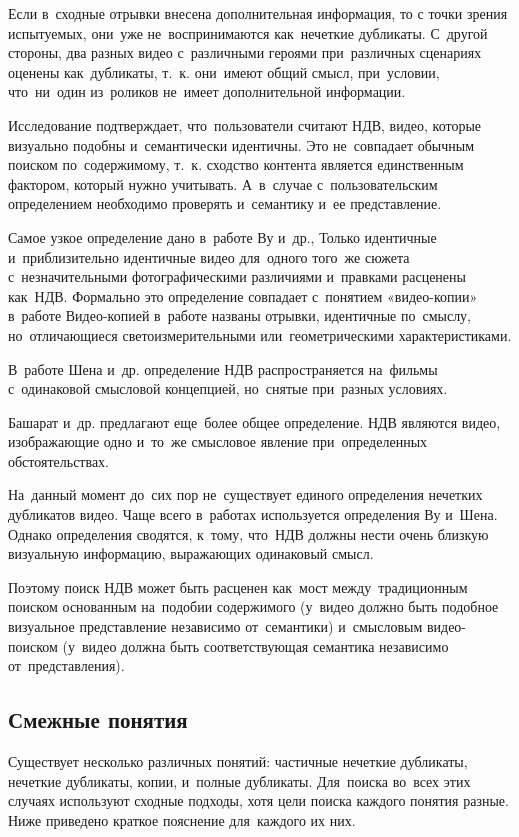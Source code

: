 Если в~сходные отрывки внесена дополнительная информация,
то с точки зрения испытуемых, 
они~уже не~воспринимаются как~нечеткие дубликаты.
С~другой стороны, два разных видео с~различными героями
при~различных сценариях оценены как~дубликаты, т.~к. они~имеют общий смысл,
при~условии, что~ни~один из~роликов не~имеет дополнительной информации.

Исследование подтверждает, что~пользователи считают НДВ,
видео, которые визуально подобны и~семантически идентичны.
Это не~совпадает обычным поиском по~содержимому,
т.~к. сходство контента является 
единственным фактором, который нужно учитывать.
А~в~случае с~пользовательским определением необходимо проверять
и~семантику и~ее представление.


Самое узкое определение дано в~работе Ву и~др.,
Только идентичные и~приблизительно идентичные видео
для~одного того~же сюжета с~незначительными фотографическими различиями
и~правками расценены как~НДВ.
Формально это определение совпадает
с~понятием «видео-копии» в~работе \cite{Law-To:2007}
Видео-копией в~работе названы отрывки, идентичные по~смыслу,
но~отличающиеся светоизмерительными или~геометрическими характеристиками.

В~работе Шена и~др. \cite{Shen:2007} определение НДВ распространяется
на~фильмы с~одинаковой смысловой концепцией, но~снятые при~разных условиях.

Башарат и~др. \cite{Basharat:2008}  
предлагают еще~более общее определение.
НДВ являются видео, изображающие одно и~то~же смысловое явление
при~определенных обстоятельствах.


На~данный момент до~сих пор не~существует единого
определения нечетких дубликатов видео.
Чаще всего в~работах используется определения Ву  и~Шена.
Однако определения сводятся, к~тому, что~НДВ должны нести очень
близкую визуальную информацию, выражающих одинаковый смысл.

Поэтому поиск НДВ может быть расценен как~мост
между~традиционным поиском основанным на~подобии содержимого
(у~видео должно быть подобное визуальное
представление независимо от~семантики)
и~смысловым видео-поиском
(у~видео должна быть соответствующая
семантика независимо от~представления).

\subsection{Смежные понятия}

Существует несколько различных понятий:
частичные нечеткие дубликаты, нечеткие дубликаты, копии, и~полные дубликаты.
Для~поиска во~всех этих случаях используют сходные подходы,
хотя цели поиска каждого понятия разные.
Ниже приведено краткое пояснение для~каждого их них.

